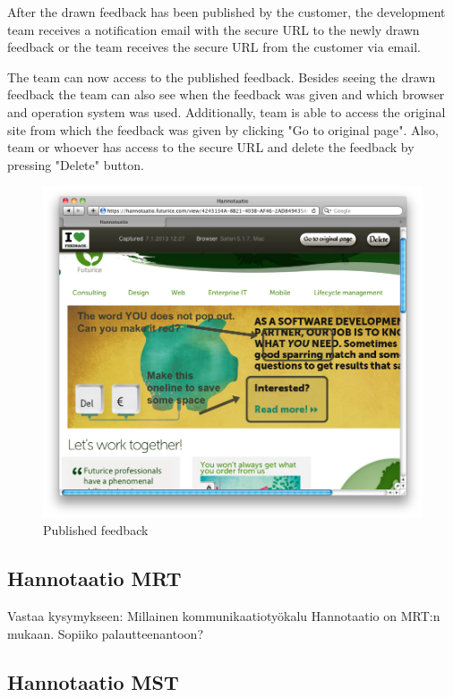 \documentclass[english,12pt,a4paper,pdftex]{article}
\begin{document}
After the drawn feedback has been published by the customer, the development team receives a notification email with the secure URL to the newly drawn feedback or the team receives the secure URL from the customer via email.

The team can now access to the published feedback. Besides seeing the drawn feedback the team can also see when the feedback was given and which browser and operation system was used. Additionally, team is able to access the original site from which the feedback was given by clicking "Go to original page". Also, team or whoever has access to the secure URL and delete the feedback by pressing "Delete" button.

\begin{figure}[htb]
\begin{center}
\includegraphics[width=1.0\textwidth]{published_feedback.png}
\end{center}
\caption{Published feedback}
\end{figure}

\subsection{Hannotaatio MRT}

Vastaa kysymykseen: Millainen kommunikaatiotyökalu Hannotaatio on MRT:n mukaan. Sopiiko palautteenantoon?

\subsection{Hannotaatio MST}
\end{document}
